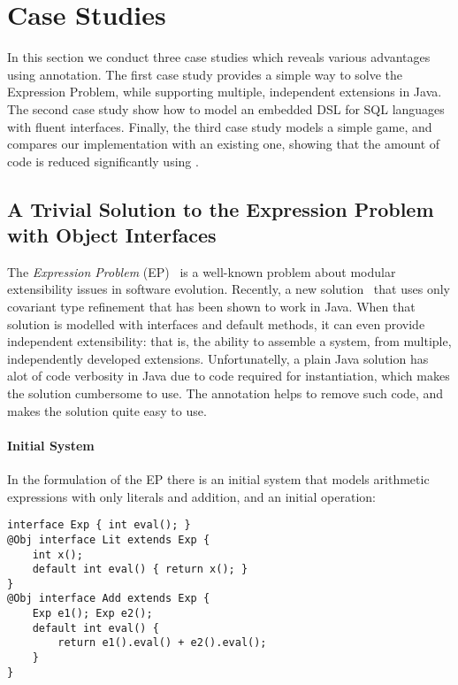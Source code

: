 \section{Case Studies}
In this section we conduct three case studies which reveals various
advantages using \mixin annotation. The first case study provides a
simple way to solve the Expression Problem, while supporting multiple,
independent extensions in Java.  The second case study show how to model an
embedded DSL for SQL languages with fluent interfaces. Finally, the third 
case study models a simple game, and compares our implementation with an 
existing one, showing that the amount of code is reduced significantly using \mixin.

\subsection{A Trivial Solution to the Expression Problem with Object Interfaces}

The \emph{Expression Problem} (EP)~\cite{wadler98expression}
is a well-known problem about modular extensibility issues in software
evolution. Recently, a new solution~\cite{eptrivially} that uses only
covariant type refinement that has been shown to work in Java. When
that solution is modelled with interfaces and default methods, it can
even provide independent extensibility: that is, the ability to
assemble a system, from multiple, independently developed extensions.
Unfortunatelly, a plain Java solution has alot of code verbosity in
Java due to code required for instantiation, which makes the solution 
cumbersome to use. The \mixin annotation helps to remove such code, and 
makes the solution quite easy to use.

\paragraph{Initial System}
In the formulation of the EP there is an initial system that models
arithmetic expressions with only literals and addition, and an initial 
operation:

\begin{lstlisting}[multicols=2]
interface Exp { int eval(); }
@Obj interface Lit extends Exp {
	int x();
	default int eval() { return x(); }
}
@Obj interface Add extends Exp {
	Exp e1(); Exp e2();
	default int eval() {
		return e1().eval() + e2().eval();
	}
}
\end{lstlisting}

